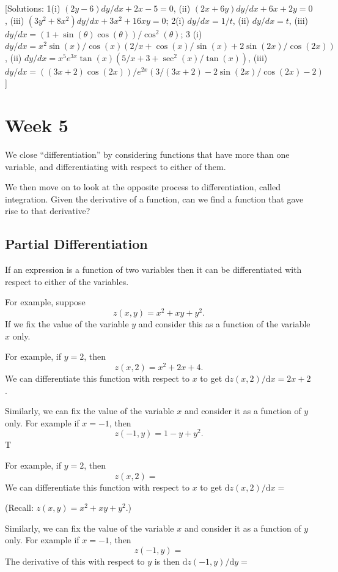 \documentclass[
  english,
  11pt,
  oneside]{book}
\newcommand{\slide}{}
\theoremstyle{definition}
\theoremstyle{definition}
\theoremstyle{definition}
\theoremstyle{definition}
\theoremstyle{remark}
\begin{document}
{[}Solutions: 1(i) \((2y-6)dy/dx+2x-5=0\), (ii) \((2x+6y)dy/dx+6x+2y=0\), (iii) \((3y^2+8x^2)dy/dx+3x^2+16xy=0\); 2(i) \(dy/dx = 1/t\), (ii) \(dy/dx = t\), (iii) \(dy/dx = (1+\sin(\theta)\cos(\theta))/\cos^2(\theta)\); 3 (i) \(dy/dx=x^2\sin(x)/\cos(x)\left(2/x+\cos(x)/\sin(x)+2\sin(2x)/\cos(2x)\right)\), (ii) \(dy/dx = x^5e^{3x}\tan(x)\left(5/x+3+\sec^2(x)/\tan(x)\right)\), (iii) \(dy/dx = ((3x+2)\cos(2x))/e^{2x}\left(3/(3x+2)-2\sin(2x)/\cos(2x)-2\right)\){]}

\chapter{Week 5}\label{week-five}

We close ``differentiation'' by considering functions that have more than one variable, and differentiating with respect to either of them.

We then move on to look at the opposite process to differentiation, called integration. Given the derivative of a function, can we find a function that gave rise to that derivative?

\slide

\section{Partial Differentiation}\label{partial-differentiation}

If an expression is a function of two variables then it can be differentiated with respect to either of the variables.

For example, suppose
\[z(x,y) = x^2+xy+y^2.\]
If we fix the value of the variable \(y\) and consider this as a function of the variable \(x\) only.

\begin{notslides}

For example, if \(y=2\), then
\[z(x,2) = x^2 + 2x + 4.\]
We can differentiate this function with respect to \(x\) to get \(\mathrm{d}z(x,2)/\mathrm{d}x = 2x+2\).

Similarly, we can fix the value of the variable \(x\) and consider it as a function of \(y\) only. For example if \(x=-1\), then
\[z(-1,y) = 1-y+y^2.\]
T

\end{notslides}

\begin{slidesonly}

For example, if \(y=2\), then
\[z(x,2) = \phantom{x^2 + 2x + 4.}\]
We can differentiate this function with respect to \(x\) to get \(\mathrm{d}z(x,2)/\mathrm{d}x =\)

\slide

(Recall: \(z(x,y) = x^2+xy+y^2\).)

Similarly, we can fix the value of the variable \(x\) and consider it as a function of \(y\) only. For example if \(x=-1\), then
\[z(-1,y) =\]
The derivative of this with respect to \(y\) is then \(\mathrm{d}z(-1,y)/\mathrm{d}y =\)

\slide

\end{slidesonly}
\end{document}
